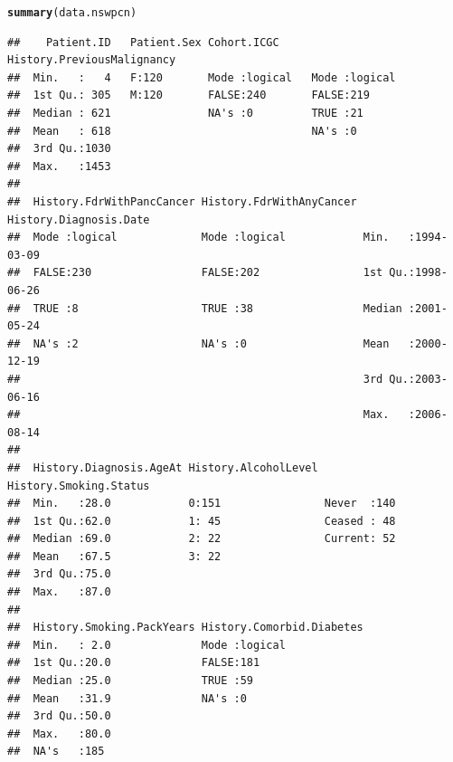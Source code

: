 \documentclass{article}\usepackage[]{graphicx}\usepackage[]{color}
\makeatletter
\newcommand{\hlstd}[1]{\textcolor[rgb]{0.345,0.345,0.345}{#1}}%
\newcommand{\hlkwd}[1]{\textcolor[rgb]{0.737,0.353,0.396}{\textbf{#1}}}%
\newenvironment{kframe}{%
 \def\at@end@of@kframe{}%
 \ifinner\ifhmode%
  \def\at@end@of@kframe{\end{minipage}}%
  \begin{minipage}{\columnwidth}%
 \fi\fi%
 \def\FrameCommand##1{\hskip\@totalleftmargin \hskip-\fboxsep
 \colorbox{shadecolor}{##1}\hskip-\fboxsep
     \hskip-\linewidth \hskip-\@totalleftmargin \hskip\columnwidth}%
 \MakeFramed {\advance\hsize-\width
   \@totalleftmargin\z@ \linewidth\hsize
   \@setminipage}}%
 {\par\unskip\endMakeFramed%
 \at@end@of@kframe}
\newenvironment{knitrout}{}{} %
\makeatother
\begin{document}
\begin{knitrout}
\color{fgcolor}\begin{kframe}
\begin{alltt}
\hlkwd{summary}\hlstd{(data.nswpcn)}
\end{alltt}
\begin{verbatim}
##    Patient.ID   Patient.Sex Cohort.ICGC     History.PreviousMalignancy
##  Min.   :   4   F:120       Mode :logical   Mode :logical             
##  1st Qu.: 305   M:120       FALSE:240       FALSE:219                 
##  Median : 621               NA's :0         TRUE :21                  
##  Mean   : 618                               NA's :0                   
##  3rd Qu.:1030                                                         
##  Max.   :1453                                                         
##                                                                       
##  History.FdrWithPancCancer History.FdrWithAnyCancer History.Diagnosis.Date
##  Mode :logical             Mode :logical            Min.   :1994-03-09    
##  FALSE:230                 FALSE:202                1st Qu.:1998-06-26    
##  TRUE :8                   TRUE :38                 Median :2001-05-24    
##  NA's :2                   NA's :0                  Mean   :2000-12-19    
##                                                     3rd Qu.:2003-06-16    
##                                                     Max.   :2006-08-14    
##                                                                           
##  History.Diagnosis.AgeAt History.AlcoholLevel History.Smoking.Status
##  Min.   :28.0            0:151                Never  :140           
##  1st Qu.:62.0            1: 45                Ceased : 48           
##  Median :69.0            2: 22                Current: 52           
##  Mean   :67.5            3: 22                                      
##  3rd Qu.:75.0                                                       
##  Max.   :87.0                                                       
##                                                                     
##  History.Smoking.PackYears History.Comorbid.Diabetes
##  Min.   : 2.0              Mode :logical            
##  1st Qu.:20.0              FALSE:181                
##  Median :25.0              TRUE :59                 
##  Mean   :31.9              NA's :0                  
##  3rd Qu.:50.0                                       
##  Max.   :80.0                                       
##  NA's   :185                                        

\end{verbatim}
\end{kframe}
\end{knitrout}
\end{document}
